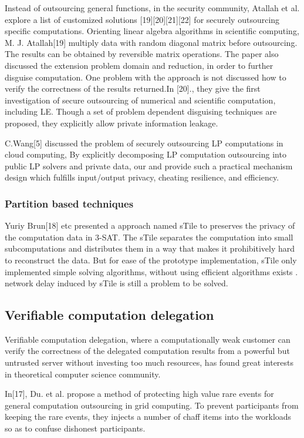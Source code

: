\documentclass[runningheads,a4paper]{llncs}
\begin{document}
Instead of outsourcing general functions, in the security community, Atallah et al. explore a list of customized solutions [19][20][21][22] for securely outsourcing specific computations. Orienting linear algebra algorithms in scientific computing, M. J. Atallah[19] multiply data with random diagonal matrix before outsourcing. The results can be obtained by reversible matrix operations. The paper also discussed the extension problem domain and reduction, in order to further disguise computation. One problem with the approach is not discussed how to verify the correctness of the results returned.In [20]., they give the first investigation of secure outsourcing of numerical and scientific computation, including LE. Though a set of problem dependent disguising techniques are proposed, they explicitly allow private information leakage.

C.Wang[5] discussed the problem of securely outsourcing LP computations in cloud computing, By explicitly decomposing LP computation outsourcing into public LP solvers and private data, our 
and provide such a practical mechanism design which fulfills input/output privacy, cheating resilience, and efficiency.

\subsubsection{Partition based techniques}

Yuriy Brun[18] etc presented a approach named sTile to preserves the privacy of the computation data in 3-SAT. The sTile separates the computation into small subcomputations and distributes them in a way that makes it prohibitively hard to reconstruct the data. But for ease of the prototype implementation, sTile only implemented simple solving algorithms, without using efficient algorithms exists . network delay induced by sTile is still a problem to be solved.
\subsection{Verifiable computation delegation}

Verifiable computation delegation, where a computationally weak customer can verify the correctness of the delegated computation results from a powerful but untrusted server without investing too much resources, has found great interests in theoretical computer science community.

In[17], Du. et al. propose a method of protecting high value rare events for general computation outsourcing in grid computing. To prevent participants from keeping the rare events, they injects a number of chaff items into the workloads so as to confuse dishonest participants.
\end{document}
